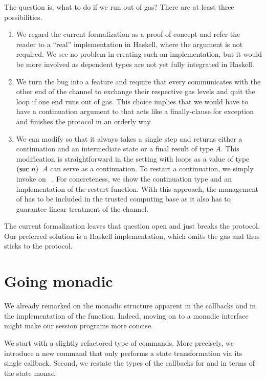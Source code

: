 \documentclass[acmsmall,review,anonymous,screen]{acmart}
\begin{document}
The question is, what to do if we run out of gas?
There are at least three possibilities.
\begin{enumerate}
\item We regard the current formalization as a proof of concept and
  refer the reader to a ``real'' implementation in Haskell, where the
   argument is not required. We see no
  problem in creating such an implementation, but it would be more
  involved as dependent types are not yet fully integrated in Haskell.
\item We turn the bug into a feature and require that every
  {\ACONTINUE} communicates with the other end of the channel to
  exchange their respective gas levels and quit the loop if one end
  runs out of gas. This choice implies that we would have to have a
  continuation argument to  {\ACONTINUE} that acts like a
  finally-clause for exception and finishes the protocol in an orderly
  way.
\item We can modify {\Aexecutor} so that it always takes a single step
  and returns either a continuation and an intermediate state or a
  final result of type $A$. This modification is straightforward in 
  the setting with loops as a value  of type {\ACommandStack~$(\Asuc~n)$~$A$}
  can serve as a continuation. To restart a continuation, we simply invoke
  {\Aexecutor} on ~\Azero. For concreteness, we show
  the continuation type and an implementation of the restart function.
  \rstAlternativeExecutorRestart
  With this approach, the management of {\Arestart}  has to be
  included in the trusted computing base as it also has to guarantee linear treatment of
  the channel.
\end{enumerate}
The current formalization leaves that question open and just breaks
the protocol. Our preferred solution is a Haskell implementation,
which omits the gas and thus sticks to the protocol.

\section{Going monadic}
\label{sec:going-monadic}


We already remarked on the monadic structure apparent in the
callbacks and in the implementation of the {\Aexecutor}
function. Indeed, moving on to a monadic interface might make our session
programs more concise.

We start with a slightly refactored type of commands. More precisely,
we introduce a new {\ACSKIP} command that only performs a state 
transformation via its single callback.
Second, we restate the types of the callbacks for {\ACSEND} and
{\ACRECV} in terms of the state monad.
\end{document}
